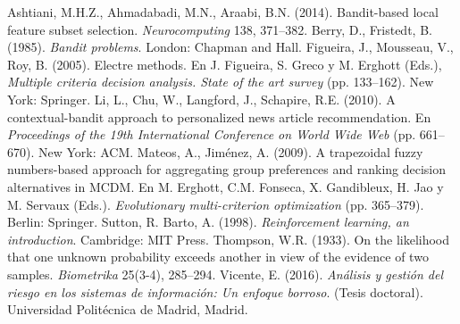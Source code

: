 \documentclass[spanish,12pt,a4paper,twoside]{book}
\begin{document}
\frontmatter


\tableofcontents %

\listoffigures
\listoftables
\listofalgorithms %

\mainmatter








\appendix


\backmatter

\begin{thebibliography}{00}
	  Ashtiani, M.H.Z., Ahmadabadi, M.N., Araabi, B.N. (2014). Bandit-based local feature subset selection. \emph{Neurocomputing} 138, 371--382.
	 Berry, D., Fristedt, B. (1985). \emph{Bandit problems}. London: Chapman and Hall.
	 Figueira, J., Mousseau, V., Roy, B. (2005). Electre methods. En J. Figueira, S. Greco y M. Erghott (Eds.), \emph{Multiple criteria decision analysis. State of the art survey} (pp. 133--162). New York: Springer.
	 Li, L., Chu, W., Langford, J., Schapire, R.E. (2010). A contextual-bandit approach to personalized news article recommendation. En \emph{Proceedings of the 19th International Conference on World Wide Web} (pp. 661--670). New York: ACM.
	 Mateos, A., Jiménez, A. (2009). A trapezoidal fuzzy numbers-based approach for aggregating group preferences and ranking decision alternatives in MCDM. En M. Erghott, C.M. Fonseca, X. Gandibleux, H. Jao y M. Servaux (Eds.). \emph{Evolutionary multi-criterion optimization} (pp. 365--379). Berlin: Springer.
	 Sutton, R. Barto, A. (1998). \emph{Reinforcement learning, an introduction}. Cambridge: MIT Press.
	 Thompson, W.R. (1933). On the likelihood that one unknown probability exceeds another in view of the evidence of two samples. \emph{Biometrika} 25(3-4), 285--294.
	 Vicente, E. (2016). \emph{Análisis y gestión del riesgo en los sistemas de información: Un enfoque borroso}. (Tesis doctoral). Universidad Politécnica de Madrid, Madrid.
\end{thebibliography}
\end{document}
